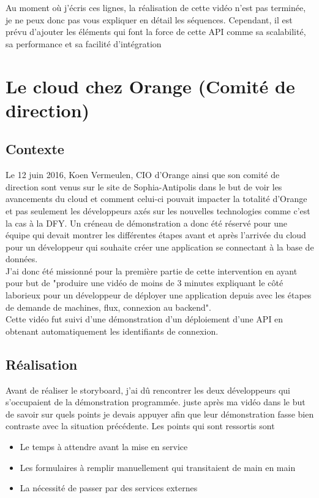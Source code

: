 Au moment où j'écris ces lignes, la réalisation de cette vidéo n'est pas terminée, je ne peux donc pas vous expliquer en détail les séquences. Cependant, il est prévu d'ajouter les éléments qui font la force de cette API comme sa scalabilité, sa performance et sa facilité d'intégration 



\section{Le cloud chez Orange (Comité de direction)}
\subsection{Contexte}
Le 12 juin 2016, Koen Vermeulen, CIO d'Orange ainsi que son comité de direction sont venus sur le site de Sophia-Antipolis dans le but de voir les avancements du cloud et comment celui-ci pouvait impacter la totalité d'Orange et pas seulement les développeurs axés sur les nouvelles technologies comme c'est la cas à la DFY. Un créneau de démonstration a donc été réservé pour une équipe qui devait montrer les différentes étapes avant et après l'arrivée du cloud pour un développeur qui souhaite créer une application se connectant à la base de données.\\

J'ai donc été missionné pour la première partie de cette intervention en ayant pour but de "produire une vidéo de moins de 3 minutes expliquant le côté laborieux pour un développeur de déployer une application depuis avec les étapes de demande de machines, flux, connexion au backend".\\

Cette vidéo fut suivi d'une démonstration d'un déploiement d'une API en obtenant automatiquement les identifiants de connexion.

\subsection{Réalisation}
Avant de réaliser le storyboard, j'ai dû rencontrer les deux développeurs qui s'occupaient de la démonstration programmée. juste après ma vidéo dans le but de savoir sur quels points je devais appuyer afin que leur démonstration fasse bien contraste avec la situation précédente. Les points qui sont ressortis sont

\begin{itemize}
    \item Le temps à attendre avant la mise en service
    \item Les formulaires à remplir manuellement qui transitaient de main en main
    \item La nécessité de passer par des services externes
\end{itemize}


